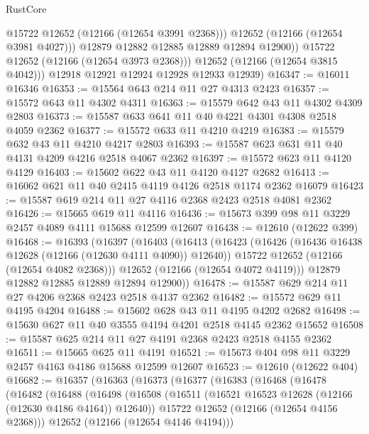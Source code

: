 \begin{lexlean}{RustCore}
\begin{coremodule}
                  @15722
                  @12652
                  (@12166 (@12654 @3991 @2368)))
                @12652
                (@12166 (@12654 @3981 @4027)))
              @12879
              @12882
              @12885
              @12889
              @12894
              @12900))
          @15722
          @12652
          (@12166 (@12654 @3973 @2368)))
        @12652
        (@12166 (@12654 @3815 @4042)))
      @12918
      @12921
      @12924
      @12928
      @12933
      @12939)
@16347 := @16011 @16346
@16353 := @15564 @643 @214 @11 @27 @4313 @2423
@16357 := @15572 @643 @11 @4302 @4311
@16363 := @15579 @642 @43 @11 @4302 @4309 @2803
@16373 := @15587 @633 @641 @11 @40 @4221 @4301 @4308 @2518 @4059 @2362
@16377 := @15572 @633 @11 @4210 @4219
@16383 := @15579 @632 @43 @11 @4210 @4217 @2803
@16393 := @15587 @623 @631 @11 @40 @4131 @4209 @4216 @2518 @4067 @2362
@16397 := @15572 @623 @11 @4120 @4129
@16403 := @15602 @622 @43 @11 @4120 @4127 @2682
@16413 := @16062 @621 @11 @40 @2415 @4119 @4126 @2518 @1174 @2362 @16079
@16423 := @15587 @619 @214 @11 @27 @4116 @2368 @2423 @2518 @4081 @2362
@16426 := @15665 @619 @11 @4116
@16436 := @15673 @399 @98 @11 @3229 @2457 @4089 @4111 @15688 @12599 @12607
@16438 := @12610 (@12622 @399)
@16468 := @16393
    (@16397
      (@16403
        (@16413
          (@16423
            (@16426 (@16436 @16438 @12628 (@12166 (@12630 @4111 @4090)) @12640))
            @15722
            @12652
            (@12166 (@12654 @4082 @2368)))
          @12652
          (@12166 (@12654 @4072 @4119)))
        @12879
        @12882
        @12885
        @12889
        @12894
        @12900))
@16478 := @15587 @629 @214 @11 @27 @4206 @2368 @2423 @2518 @4137 @2362
@16482 := @15572 @629 @11 @4195 @4204
@16488 := @15602 @628 @43 @11 @4195 @4202 @2682
@16498 := @15630 @627 @11 @40 @3555 @4194 @4201 @2518 @4145 @2362 @15652
@16508 := @15587 @625 @214 @11 @27 @4191 @2368 @2423 @2518 @4155 @2362
@16511 := @15665 @625 @11 @4191
@16521 := @15673 @404 @98 @11 @3229 @2457 @4163 @4186 @15688 @12599 @12607
@16523 := @12610 (@12622 @404)
@16682 := @16357
    (@16363
      (@16373
        (@16377
          (@16383
            (@16468
              (@16478
                (@16482
                  (@16488
                    (@16498
                      (@16508
                        (@16511 (@16521 @16523 @12628 (@12166 (@12630 @4186 @4164)) @12640))
                        @15722
                        @12652
                        (@12166 (@12654 @4156 @2368)))
                      @12652
                      (@12166 (@12654 @4146 @4194)))

\end{coremodule}
\end{lexlean}
